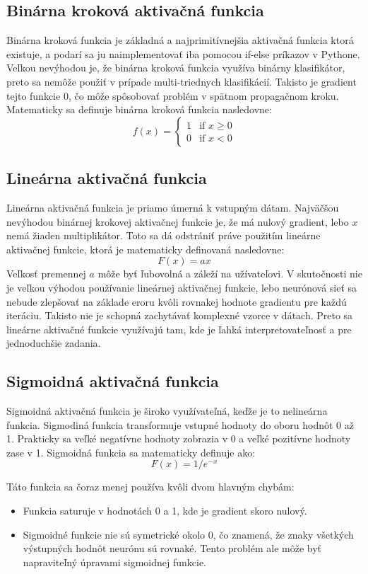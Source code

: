 \subsection{Binárna kroková aktivačná funkcia}
Binárna kroková funkcia je základná a najprimitívnejšia aktivačná funkcia ktorá existuje, a podarí sa ju naimplementovať iba pomocou if-else príkazov v Pythone. Veľkou nevýhodou je, že binárna kroková funkcia využíva binárny klasifikátor, preto  sa nemôže použiť v prípade multi-triednych klasifikácií. Takisto je gradient tejto funkcie 0, čo môže spôsobovať problém v spätnom propagačnom kroku. Matematicky sa definuje binárna kroková funkcia nasledovne: 
$$f(x) =
\left\{
	\begin{array}{ll}
		1  & \mbox{if } x \geq 0 \\
		0 & \mbox{if } x < 0
	\end{array}
\right.$$
\cite{sharma}

\subsection{Lineárna aktivačná funkcia}

Lineárna aktivačná funkcia je priamo úmerná k vstupným dátam. Najväčšou nevýhodou binárnej krokovej aktivačnej funkcie je, že má nulový gradient, lebo $x$ nemá žiaden multiplikátor. Toto sa dá odstrániť práve použitím lineárne aktivačnej funkcie, ktorá je matematicky definovaná nasledovne:
$$F(x) = ax$$
Veľkosť premennej $a$ môže byť ľubovolná a záleží na užívateľovi. V skutočnosti nie je veľkou výhodou používanie lineárnej aktivačnej funkcie, lebo neurónová sieť sa nebude zlepšovať na základe eroru kvôli rovnakej hodnote gradientu pre každú iteráciu. Takisto nie je schopná zachytávať komplexné vzorce v dátach. Preto sa lineárne aktivačné funkcie využívajú tam, kde je ľahká interpretovateľnosť a pre jednoduchšie zadania.\cite{sharma}


\subsection{Sigmoidná aktivačná funkcia}
Sigmoidná aktivačná funkcia je široko využívateľná, keďže  je to  nelineárna funkcia. Sigmodiná funkcia transformuje vstupné hodnoty do oboru hodnôt 0 až 1. Prakticky sa veľké negatívne hodnoty zobrazia v 0 a veľké pozitívne hodnoty zase v 1\cite{stanford}. Sigmoidná funkcia sa matematicky definuje ako:
$$F(x) = 1/e^{-x}$$\cite{sharma}

Táto funkcia sa čoraz menej používa kvôli dvom hlavným chybám:
\begin{itemize}
    \item Funkcia saturuje v hodnotách 0 a 1, kde je gradient  skoro nulový.
    \item Sigmoidné funkcie nie sú symetrické okolo 0, čo znamená, že znaky  všetkých výstupných hodnôt neurónu sú rovnaké. Tento problém ale môže byť napraviteľný úpravami sigmoidnej funkcie.
\end{itemize}\cite{stanford}

